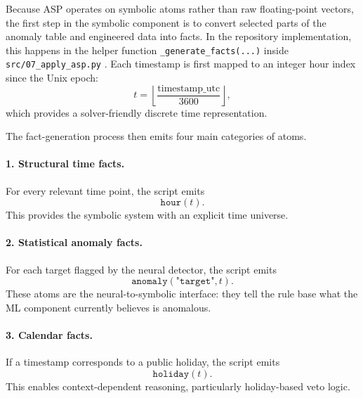 Because ASP operates on symbolic atoms rather than raw floating-point vectors, the first step in the symbolic component is to convert selected parts of the anomaly table and engineered data into facts. In the repository implementation, this happens in the helper function \texttt{\_generate\_facts(...)} inside \texttt{src/07\_apply\_asp.py} \cite{repo_thesis_grid_anomaly}. Each timestamp is first mapped to an integer hour index since the Unix epoch:
\begin{equation}
	t = \left\lfloor \frac{\mathrm{timestamp\_utc}}{3600} \right\rfloor,
	\label{eq:hour_index}
\end{equation}
which provides a solver-friendly discrete time representation.

The fact-generation process then emits four main categories of atoms.

\paragraph{1. Structural time facts.}
For every relevant time point, the script emits
\begin{equation}
	\texttt{hour}(t).
\end{equation}
This provides the symbolic system with an explicit time universe.

\paragraph{2. Statistical anomaly facts.}
For each target flagged by the neural detector, the script emits
\begin{equation}
	\texttt{anomaly}(\texttt{"target"}, t).
	\label{eq:anomaly_fact}
\end{equation}
These atoms are the neural-to-symbolic interface: they tell the rule base what the ML component currently believes is anomalous.

\paragraph{3. Calendar facts.}
If a timestamp corresponds to a public holiday, the script emits
\begin{equation}
	\texttt{holiday}(t).
	\label{eq:holiday_fact}
\end{equation}
This enables context-dependent reasoning, particularly holiday-based veto logic.

